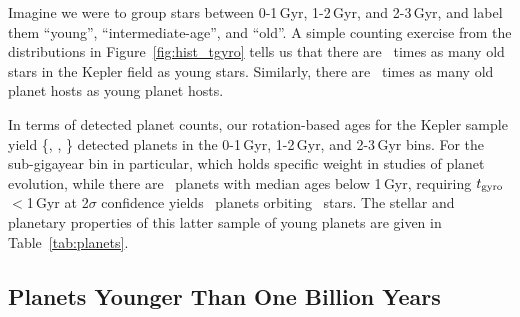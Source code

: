 \documentclass[11pt,twocolumn,tighten]{aastex63}
\begin{document}
%

Imagine we were to group stars between 0-1\,Gyr, 1-2\,Gyr, and
2-3\,Gyr, and label them ``young'', ``intermediate-age'', and ``old''.
A simple counting exercise from the distributions in
Figure~\ref{fig:hist_tgyro} tells us that there are \ratioobtoybstars\
times as many old stars in the Kepler field as young stars.
Similarly, there are \ratioobtoybplanets\ times as many old planet
hosts as young planet hosts. 

In terms of detected planet counts, our rotation-based ages for
the Kepler sample yield \{\nplyounggyro, \nplmidgyro, \nploldgyro\}
detected planets in the 0-1\,Gyr, 1-2\,Gyr, and 2-3\,Gyr bins.
For the sub-gigayear bin in particular, which holds specific weight in
studies of planet evolution, while there are \nplyounggyro\ planets
with median ages below 1\,Gyr, requiring $t_{\rm
gyro}$$<$1\,Gyr at 2$\sigma$ confidence yields
\nplyounggyrotwosigma\ planets orbiting \nplhostsyounggyrotwosigma\
stars.
The stellar and planetary properties of this latter sample of young
planets are given in Table~\ref{tab:planets}.


\subsection{Planets Younger Than One Billion Years}
\end{document}
